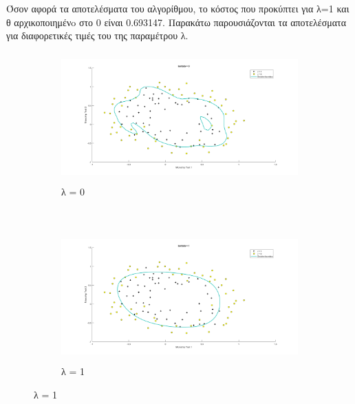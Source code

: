 \documentclass{article}
\begin{document}
	\pagebreak
	\noindent
	Όσον αφορά τα αποτελέσματα του αλγορίθμου, το κόστος που προκύπτει για λ=1 και θ αρχικοποιημένo στο 0 είναι 0.693147. Παρακάτω παρουσιάζονται τα αποτελέσματα για διαφορετικές τιμές του της παραμέτρου λ.
	\begin{figure}[h!]
		\centering
		\begin{subfigure}[t]{0.5\textwidth}
			\centering
			\includegraphics[height=5cm, width=\linewidth]{../exercise2_2/images/ex2_lambda_0.png}
			\caption{λ = 0}
		\end{subfigure}%
		~
		\begin{subfigure}[t]{0.5\textwidth}
			\centering
			\includegraphics[height=5cm, width=\linewidth]{../exercise2_2/images/ex2_lambda_1.png}
			\caption{λ = 1}
		\end{subfigure}
	

\end{figure}
\end{document}
